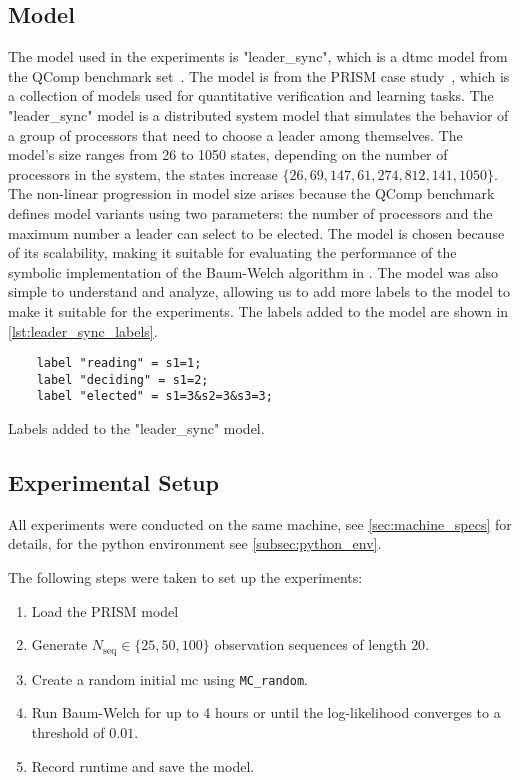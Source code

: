\subsection{Model}
The model used in the experiments is "leader\_sync", which is a \gls{dtmc} model from the QComp benchmark set~\cite{hartmanns2019quantitative}.
The model is from the PRISM case study~\cite{kwiatkowska2012prism}, which is a collection of models used for quantitative verification and learning tasks.
The "leader\_sync" model is a distributed system model that simulates the behavior of a group of processors that need to choose a leader among themselves.
The model's size ranges from 26 to 1050 states, depending on the number of processors in the system, the states increase $\{26, 69, 147, 61, 274, 812, 141, 1050\}$.
The non-linear progression in model size arises because the QComp benchmark defines model variants using two parameters: the number of processors and the maximum number a leader can select to be elected.
The model is chosen because of its scalability, making it suitable for evaluating the performance of the symbolic implementation of the Baum-Welch algorithm in \JajapyTwo.
The model was also simple to understand and analyze, allowing us to add more labels to the model to make it suitable for the experiments.
The labels added to the model are shown in \autoref{lst:leader_sync_labels}.

\begin{listing}[htb!]
    \begin{verbatim}
    label "reading" = s1=1;
    label "deciding" = s1=2;
    label "elected" = s1=3&s2=3&s3=3;
    \end{verbatim}
    \caption{Labels added to the "leader\_sync" model.}
    \label{lst:leader_sync_labels}
\end{listing}


\subsection{Experimental Setup}
All experiments were conducted on the same machine, see \autoref{sec:machine_specs} for details, for the python environment see \autoref{subsec:python_env}.

The following steps were taken to set up the experiments:
\begin{enumerate}
    \item Load the PRISM model
    \item Generate $N_\text{seq}\in\{25,50,100\}$ observation sequences of length $20$.
    \item Create a random initial \gls{mc} using \texttt{MC\_random}.
    \item Run Baum-Welch for up to 4 hours or until the log-likelihood converges to a threshold of $0.01$.
    \item Record runtime and save the model.
\end{enumerate}


